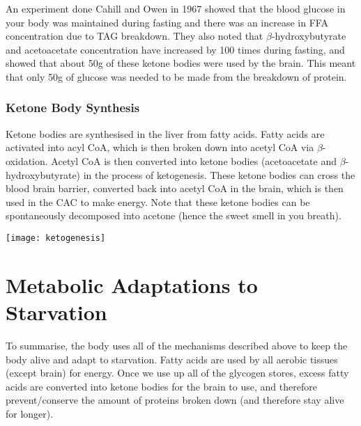 An experiment done Cahill and Owen in 1967 showed that the blood glucose in your body was maintained during fasting and there was an increase in FFA concentration due to TAG breakdown.
They also noted that $\beta$-hydroxybutyrate and acetoacetate concentration have increased by 100 times during fasting, and showed that about 50g of these ketone bodies were used by the brain.
This meant that only 50g of glucose was needed to be made from the breakdown of protein.

\subsubsection{Ketone Body Synthesis}

Ketone bodies are synthesised in the liver from fatty acids.
Fatty acids are activated into acyl CoA, which is then broken down into acetyl CoA via $\beta$-oxidation.
Acetyl CoA is then converted into ketone bodies (acetoacetate and $\beta$-hydroxybutyrate) in the process of ketogenesis.
These ketone bodies can cross the blood brain barrier, converted back into acetyl CoA in the brain, which is then used in the CAC to make energy.
Note that these ketone bodies can be spontaneously decomposed into acetone (hence the sweet smell in you breath).

\begin{center}
\texttt{[image: ketogenesis]}
\end{center}

\section{Metabolic Adaptations to Starvation}

To summarise, the body uses all of the mechanisms described above to keep the body alive and adapt to starvation.
Fatty acids are used by all aerobic tissues (except brain) for energy.
Once we use up all of the glycogen stores, excess fatty acids are converted into ketone bodies for the brain to use, and therefore prevent/conserve the amount of proteins broken down (and therefore stay alive for longer).

